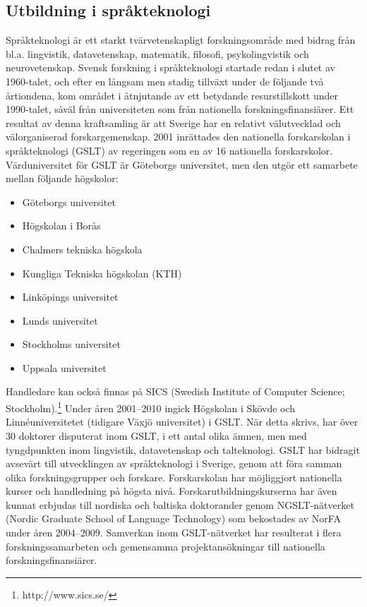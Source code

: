 \begin{multicols}{2}
\subsection{Utbildning i språkteknologi}

Språkteknologi är ett starkt tvärvetenskapligt forskningsområde med
bidrag från bl.a. lingvistik, datavetenskap, matematik, filosofi,
psykolingvistik och neurovetenskap. Svensk forskning i språkteknologi
startade redan i slutet av 1960-talet, och efter en långsam men stadig
tillväxt under de följande två årtiondena, kom området i åtnjutande av
ett betydande resurstillskott under 1990-talet, såväl från
universiteten som från nationella forskningsfinansiärer. Ett resultat
av denna kraftsamling är att Sverige har en relativt välutvecklad och
välorganiserad forskargemenskap. 2001 inrättades den nationella
forskarskolan i språkteknologi (GSLT) av regeringen som en av 16
nationella forskarskolor. Värduniversitet för GSLT är Göteborgs
universitet, men den utgör ett samarbete mellan följande högskolor:

\begin{itemize}[itemsep=0pt,parsep=0pt]
\item Göteborgs universitet
\item Högskolan i Borås
\item Chalmers tekniska högskola
\item Kungliga Tekniska högskolan (KTH)
\item Linköpings universitet
\item Lunds universitet
\item Stockholms universitet
\item Uppsala universitet
\end{itemize}

Handledare kan också finnas på SICS (Swedish Institute of Computer
Science; Stockholm).\footnote{http://www.sics.se/} Under åren
2001--2010 ingick Högskolan i Skövde och Linnéuniversitetet (tidigare
Växjö universitet) i GSLT. När detta skrivs, har över 30 doktorer
disputerat inom GSLT, i ett antal olika ämnen, men med tyngdpunkten
inom lingvistik, datavetenskap och talteknologi. GSLT har bidragit
avsevärt till utvecklingen av språkteknologi i Sverige, genom att föra
samman olika forskningsgrupper och forskare. Forskarskolan har
möjliggjort nationella kurser och handledning på högsta
nivå. Forskarutbildningskurserna har även kunnat erbjudas till
nordiska och baltiska doktorander genom NGSLT-nätverket (Nordic
Graduate School of Language Technology) som bekostades av NorFA under
åren 2004--2009. Samverkan inom GSLT-nätverket har resulterat i flera
forskningssamarbeten och gemensamma projektansökningar till nationella
forskningsfinansiärer.


\end{multicols}
